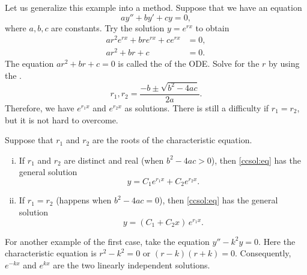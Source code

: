 \documentclass[12pt]{book}
\begin{document}
Let us generalize this example into a method.
Suppose that we have an equation
\begin{equation} \label{ccsol:eq}
a y'' + b y' + c y = 0 ,
\end{equation}
where $a, b, c$ are constants.  Try the solution $y = e^{rx}$ to obtain
\begin{align*}
a r^2 e^{rx} + 
b r e^{rx} + 
c e^{rx} & = 0 , \\
a r^2 + 
b r + 
c & = 0 .
\end{align*}
The equation $a r^2 + b r + c = 0$ is called the \emph{} of the ODE.
Solve for the $r$ by using the .
\begin{equation*}
r_1, r_2 = \frac{-b \pm \sqrt{b^2 - 4ac}}{2a} .
\end{equation*}
Therefore, we have $e^{r_1 x}$ and $e^{r_2 x}$ as solutions.  There is
still a difficulty if $r_1 = r_2$, but it is not hard to overcome.

\begin{theorem}
Suppose that $r_1$ and $r_2$ are the roots of the characteristic equation.
\begin{enumerate}[(i)]
\item If $r_1$ and $r_2$ are distinct and real (when $b^2 - 4ac > 0$),
then \eqref{ccsol:eq} has the general solution
\begin{equation*}
y = C_1 e^{r_1 x} + C_2 e^{r_2 x} .
\end{equation*}
\item If $r_1 = r_2$ (happens when $b^2 - 4ac = 0$), 
then \eqref{ccsol:eq} has the general solution
\begin{equation*}
y = (C_1 + C_2 x)\, e^{r_1 x} .
\end{equation*}
\end{enumerate}
\end{theorem}

For another example of the
first case, take the equation $y'' - k^2 y = 0$.  Here the
characteristic equation is $r^2 - k^2 = 0$ or 
$(r-k)(r+k) = 0$.  Consequently, $e^{-k x}$ and $e^{kx}$ are the two
linearly independent solutions.
\end{document}
